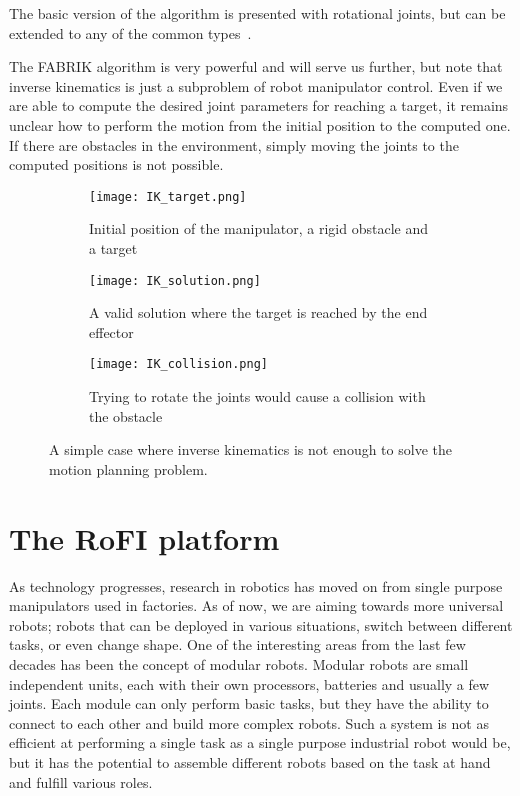 The basic version of the algorithm is presented with rotational joints, but can be extended to any of the common types~\cite{fabrikConstraints}.

The FABRIK algorithm is very powerful and will serve us further, but note that inverse kinematics is just a subproblem of robot manipulator control. Even if we are able to compute the desired joint parameters for reaching a target, it remains unclear how to perform the motion from the initial position to the computed one. If there are obstacles in the environment, simply moving the joints to the computed positions is not possible.

\begin{figure}
\centering
\begin{subfigure}{.3\textwidth}
  \centering
  \texttt{[image: IK\_target.png]}
  \caption{Initial position of the manipulator, a rigid obstacle and a target}
\end{subfigure}%
\begin{subfigure}{.3\textwidth}
  \centering
  \texttt{[image: IK\_solution.png]}
  \caption{A valid solution where the target is reached by the end effector}
\end{subfigure}%
\begin{subfigure}{.3\textwidth}
  \centering
  \texttt{[image: IK\_collision.png]}
  \caption{Trying to rotate the joints would cause a collision with the obstacle}
\end{subfigure}
\caption{A simple case where inverse kinematics is not enough to solve the motion planning problem.}\label{fig:ikcoll}
\end{figure}

\newpage
\section{The RoFI platform}

As technology progresses, research in robotics has moved on from single purpose manipulators used in factories. As of now, we are aiming towards more universal robots; robots that can be deployed in various situations, switch between different tasks, or even change shape. One of the interesting areas from the last few decades has been the concept of modular robots. Modular robots are small independent units, each with their own processors, batteries and usually a few joints. Each module can only perform basic tasks, but they have the ability to connect to each other and build more complex robots. Such a system is not as efficient at performing a single task as a single purpose industrial robot would be, but it has the potential to assemble different robots based on the task at hand and fulfill various roles.


